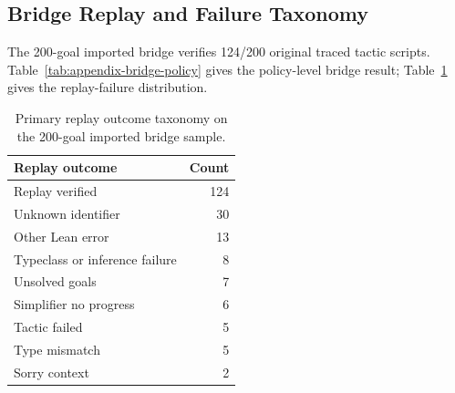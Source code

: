 \documentclass{article}
\begin{document}
\subsection{Bridge Replay and Failure Taxonomy}

The 200-goal imported bridge verifies 124/200 original traced tactic scripts. Table~\ref{tab:appendix-bridge-policy} gives the policy-level bridge result; Table~\ref{tab:appendix-bridge-failures} gives the replay-failure distribution.

\begin{table}[H]
\caption{Imported bridge policy-level diagnostics on 200 goals. Trace-core success and bridge-verified success are intentionally reported separately.}
\label{tab:appendix-bridge-policy}
\centering
\small
{}
\end{table}

\begin{table}[H]
\caption{Primary replay outcome taxonomy on the 200-goal imported bridge sample.}
\label{tab:appendix-bridge-failures}
\centering
\small
\begin{tabular}{lr}
\toprule
Replay outcome & Count \\
\midrule
Replay verified & 124 \\
Unknown identifier & 30 \\
Other Lean error & 13 \\
Typeclass or inference failure & 8 \\
Unsolved goals & 7 \\
Simplifier no progress & 6 \\
Tactic failed & 5 \\
Type mismatch & 5 \\
Sorry context & 2 \\
\bottomrule
\end{tabular}
\end{table}
\end{document}
